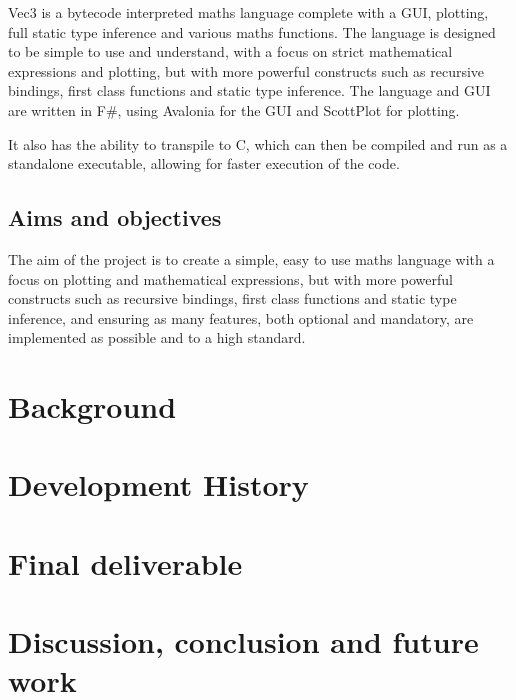 \documentclass[a4paper, oneside, 11pt]{report}
\begin{document}
Vec3 is a bytecode interpreted maths language complete with a GUI, plotting, full static type inference and various
maths functions.
The language is designed to be simple to use and understand, with a focus on strict mathematical expressions and plotting,
but with more powerful constructs such as recursive bindings, first class functions and static type inference.
The language and GUI are written in F\#, using Avalonia\citep{avalonia} for the GUI and ScottPlot\citep{scottPlot} for plotting.

It also has the ability to transpile to C, which can then be compiled and run as a standalone executable, allowing for
faster execution of the code.

\section{Aims and objectives}\label{sec:aims-and-objectives}

The aim of the project is to create a simple, easy to use maths language with a focus on plotting and mathematical
expressions, but with more powerful constructs such as recursive bindings, first class functions and static type 
inference, and ensuring as many features, both optional and mandatory, are implemented as possible and to a high 
standard.

\chapter{Background}\label{ch:background}

\chapter{Development History}\label{ch:devhist}



\chapter{Final deliverable}\label{ch:impl}



\chapter{Discussion, conclusion and future work}\label{ch:discussion-conclusion-and-future-work}



\end{document}
